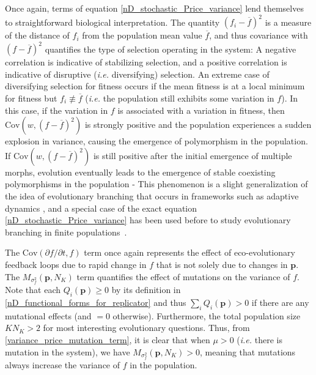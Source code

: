 Once again, terms of equation \eqref{nD_stochastic_Price_variance} lend themselves to straightforward biological interpretation. The quantity $(f_i-\overline{f})^2$ is a measure of the distance of $f_i$ from the population mean value $\overline{f}$, and thus covariance with $(f-\overline{f})^2$ quantifies the type of selection operating in the system: A negative correlation is indicative of stabilizing selection, and a positive correlation is indicative of disruptive (\emph{i.e.} diversifying) selection. An extreme case of diversifying selection for fitness occurs if the mean fitness is at a local minimum for fitness but $f_i \not\equiv \overline{f}$ (\emph{i.e.} the population still exhibits some variation in $f$). In this case, if the variation in $f$ is associated with a variation in fitness, then $\textrm{Cov}(w,(f - \overline{f})^2)$ is strongly positive and the population experiences a sudden explosion in variance, causing the emergence of polymorphism in the population. If $\textrm{Cov}(w,(f - \overline{f})^2)$ is still positive after the initial emergence of multiple morphs, evolution eventually leads to the emergence of stable coexisting polymorphisms in the population - This phenomenon is a slight generalization of the idea of evolutionary branching that occurs in frameworks such as adaptive dynamics \citep{geritz_evolutionarily_1998}, and a special case of the exact equation \eqref{nD_stochastic_Price_variance} has been used before to study evolutionary branching in finite populations~\citep{debarre_evolutionary_2016}.

The $\textrm{Cov}\left(\partial f/\partial t,f\right)$ term once again represents the effect of eco-evolutionary feedback loops due to rapid change in $f$ that is not solely due to changes in $\mathbf{p}$. The $M_{\sigma^2_f}(\mathbf{p},N_K)$ term quantifies the effect of mutations on the variance of $f$. Note that each $Q_i(\mathbf{p}) \geq 0$ by its definition in \eqref{nD_functional_forms_for_replicator} and thus $\sum_i Q_i(\mathbf{p}) > 0$ if there are any mutational effects (and $=0$ otherwise). Furthermore, the total population size $KN_K > 2$ for most interesting evolutionary questions. Thus, from \eqref{variance_price_mutation_term}, it is clear that when $\mu > 0$ (\emph{i.e.} there is mutation in the system), we have $M_{\sigma^2_f}(\mathbf{p},N_K) > 0$, meaning that mutations always increase the variance of $f$ in the population.

